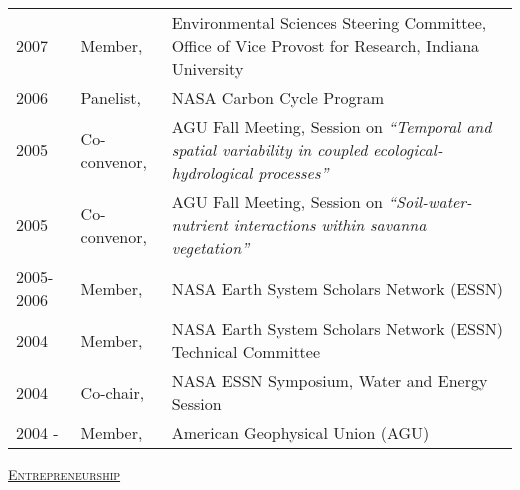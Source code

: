 \documentclass[10pt]{report}
\begin{document}
\begin{longtable}{p{.75in} p{1.1in} p{4.2in}}
2007 & Member, & Environmental Sciences Steering Committee, Office of Vice Provost for Research,  Indiana University  \\ 
2006 & Panelist, & NASA Carbon Cycle Program \\
2005 & Co-convenor, &  AGU Fall Meeting, Session on \emph{``Temporal and spatial variability in coupled ecological-hydrological processes''} \\
2005 & Co-convenor, &  AGU Fall Meeting, Session on \emph{``Soil-water-nutrient interactions within savanna vegetation''}  \\
2005-2006 & Member, &  NASA Earth System Scholars Network (ESSN)    \\ 
2004 & Member, &  NASA Earth System Scholars Network (ESSN) Technical Committee \\
2004 & Co-chair, &  NASA ESSN Symposium, Water and Energy Session \\
2004 - &  Member, & American Geophysical Union (AGU)  \\



\end{longtable}

\vspace*{.1in}
\textsc{\underline{Entrepreneurship}}
\end{document}
